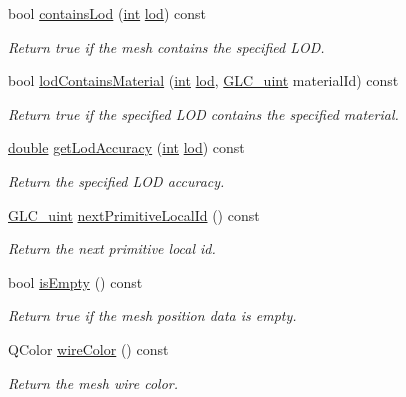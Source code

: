 \begin{DoxyCompactItemize}
bool \hyperlink{class_g_l_c___mesh_adedfaaf5304a633b1e0e6a943671c413}{contains\-Lod} (\hyperlink{ioapi_8h_a787fa3cf048117ba7123753c1e74fcd6}{int} \hyperlink{glext_8h_a5b5a34b88a28ab9c203c2b432f6168b6}{lod}) const 
\begin{DoxyCompactList}\small\item\em Return true if the mesh contains the specified L\-O\-D. \end{DoxyCompactList}\item 
bool \hyperlink{class_g_l_c___mesh_a5dd2f2454a0078f5255caea7321edca6}{lod\-Contains\-Material} (\hyperlink{ioapi_8h_a787fa3cf048117ba7123753c1e74fcd6}{int} \hyperlink{glext_8h_a5b5a34b88a28ab9c203c2b432f6168b6}{lod}, \hyperlink{glc__global_8h_abf950976fabed69026558df8e2da6c6b}{G\-L\-C\-\_\-uint} material\-Id) const 
\begin{DoxyCompactList}\small\item\em Return true if the specified L\-O\-D contains the specified material. \end{DoxyCompactList}\item 
\hyperlink{_super_l_u_support_8h_a8956b2b9f49bf918deed98379d159ca7}{double} \hyperlink{class_g_l_c___mesh_a6e2b6c4918907553b87296eb8d666397}{get\-Lod\-Accuracy} (\hyperlink{ioapi_8h_a787fa3cf048117ba7123753c1e74fcd6}{int} \hyperlink{glext_8h_a5b5a34b88a28ab9c203c2b432f6168b6}{lod}) const 
\begin{DoxyCompactList}\small\item\em Return the specified L\-O\-D accuracy. \end{DoxyCompactList}\item 
\hyperlink{glc__global_8h_abf950976fabed69026558df8e2da6c6b}{G\-L\-C\-\_\-uint} \hyperlink{class_g_l_c___mesh_ac695e40bdaa8f10fc81262710794c8fd}{next\-Primitive\-Local\-Id} () const 
\begin{DoxyCompactList}\small\item\em Return the next primitive local id. \end{DoxyCompactList}\item 
bool \hyperlink{class_g_l_c___mesh_a928f7ee941512a819abba4803f576495}{is\-Empty} () const 
\begin{DoxyCompactList}\small\item\em Return true if the mesh position data is empty. \end{DoxyCompactList}\item 
Q\-Color \hyperlink{class_g_l_c___mesh_a2f5d0f4fe29eb85fed8416dd75c55beb}{wire\-Color} () const 
\begin{DoxyCompactList}\small\item\em Return the mesh wire color. \end{DoxyCompactList}\item 

\end{DoxyCompactItemize}
